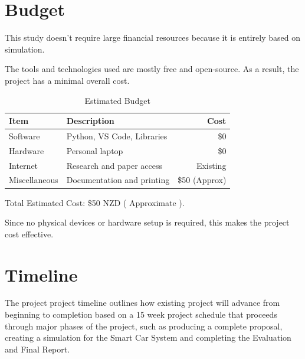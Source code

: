 \documentclass[a4paper,man,12pt]{article}
\begin{document}
\section{Budget}

 
This study doesn't require large financial resources because it is entirely based on simulation.

The tools and technologies used are mostly free and open-source. As a result, the project has a minimal overall cost.
    
\begin{table}[h]
\centering
\caption{Estimated Budget}
\begin{tabular}{|l|p{7cm}|r|}
\hline
\textbf{Item} & \textbf{Description} & \textbf{Cost} \\
\hline
Software & Python, VS Code, Libraries & \$0 \\
\hline
Hardware & Personal laptop & \$0 \\
\hline
Internet & Research and paper access & Existing \\
\hline
Miscellaneous & Documentation and printing & \$50 (Approx) \\
\hline
\end{tabular}
\label{tab:estimated_budget}
\end{table}

Total Estimated Cost: \$50 NZD ( Approximate ).


Since no physical devices or hardware setup is required, this makes the project cost effective.


\pagebreak

\section{Timeline}

The project project timeline outlines how existing project will advance from beginning to completion based on a 15 week project schedule that proceeds through major phases of the project, such as producing a complete proposal, creating a simulation for the Smart Car System and completing the Evaluation and Final Report.
\end{document}
